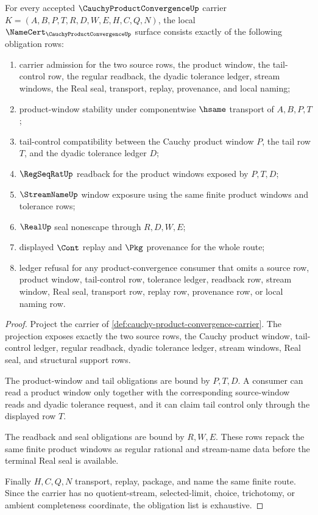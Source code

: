 \begin{theorem}
\label{thm:cauchy-product-convergence-namecert-obligations}
For every accepted $\CauchyProductConvergenceUp$ carrier $K=(A,B,P,T,R,D,W,E,H,C,Q,N)$, the local $\NameCert_{\CauchyProductConvergenceUp}$ surface consists exactly of the following obligation rows:
\begin{enumerate}
\item carrier admission for the two source rows, the product window, the tail-control row, the regular readback, the dyadic tolerance ledger, stream windows, the Real seal, transport, replay, provenance, and local naming;
\item product-window stability under componentwise $\hsame$ transport of $A,B,P,T$;
\item tail-control compatibility between the Cauchy product window $P$, the tail row $T$, and the dyadic tolerance ledger $D$;
\item $\RegSeqRatUp$ readback for the product windows exposed by $P,T,D$;
\item $\StreamNameUp$ window exposure using the same finite product windows and tolerance rows;
\item $\RealUp$ seal nonescape through $R,D,W,E$;
\item displayed $\Cont$ replay and $\Pkg$ provenance for the whole route;
\item ledger refusal for any product-convergence consumer that omits a source row, product window, tail-control row, tolerance ledger, readback row, stream window, Real seal, transport row, replay row, provenance row, or local naming row.
\end{enumerate}
\end{theorem}
\begin{proof}
Project the carrier of \autoref{def:cauchy-product-convergence-carrier}. The projection exposes exactly the two source rows, the Cauchy product window, tail-control ledger, regular readback, dyadic tolerance ledger, stream windows, Real seal, and structural support rows.

The product-window and tail obligations are bound by $P,T,D$. A consumer can read a product window only together with the corresponding source-window reads and dyadic tolerance request, and it can claim tail control only through the displayed row $T$.

The readback and seal obligations are bound by $R,W,E$. These rows repack the same finite product windows as regular rational and stream-name data before the terminal Real seal is available.

Finally $H,C,Q,N$ transport, replay, package, and name the same finite route. Since the carrier has no quotient-stream, selected-limit, choice, trichotomy, or ambient completeness coordinate, the obligation list is exhaustive.
\end{proof}

